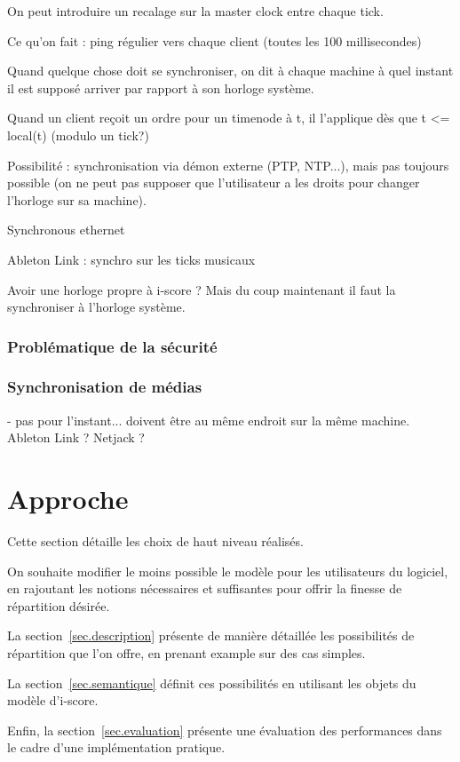 \documentclass{article}
\begin{document}
On peut introduire un recalage sur la master clock entre chaque tick.

Ce qu'on fait : ping régulier vers chaque client (toutes les 100 millisecondes)

Quand quelque chose doit se synchroniser, on dit à chaque machine à quel instant il est supposé arriver par rapport à son horloge système.

Quand un client reçoit un ordre pour un timenode à t, il l'applique dès que t <= local(t) (modulo un tick?)



Possibilité : synchronisation via démon externe (PTP, NTP...), mais pas toujours possible (on ne peut pas supposer que l'utilisateur a les droits pour changer l'horloge sur sa machine).

Synchronous ethernet

Ableton Link : synchro sur les ticks musicaux 

Avoir une horloge propre à i-score ? Mais du coup maintenant il faut la synchroniser à l'horloge système. 

\subsubsection{Problématique de la sécurité}

\subsubsection{Synchronisation de médias}
- pas pour l'instant... doivent être au même endroit sur la même machine.
Ableton Link ? Netjack ?

\section{Approche}
Cette section détaille les choix de haut niveau réalisés.

On souhaite modifier le moins possible le modèle pour les utilisateurs du logiciel, 
en rajoutant les notions nécessaires et suffisantes pour offrir la finesse de répartition désirée.

La section~\ref{sec.description} présente de manière détaillée les possibilités 
de répartition que l'on offre, en prenant example sur des cas simples.

La section~\ref{sec.semantique} définit ces possibilités en utilisant les objets du modèle d'i-score.

Enfin, la section~\ref{sec.evaluation} présente une évaluation des performances dans le cadre 
d'une implémentation pratique.
\end{document}
